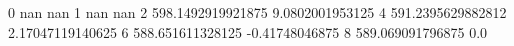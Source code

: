 0 nan nan
1 nan nan
2 598.1492919921875 9.0802001953125
4 591.2395629882812 2.17047119140625
6 588.651611328125 -0.41748046875
8 589.069091796875 0.0
